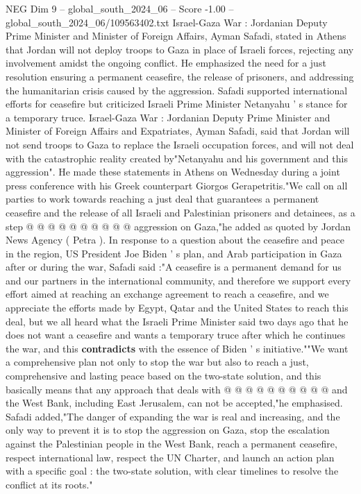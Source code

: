 \begin{textsample}{NEG Dim 9 – global\_south\_2024\_06 – Score -1.00 – global\_south\_2024\_06/109563402.txt}  \label{ex:f9_neg_402}
Israel-Gaza War : Jordanian Deputy Prime Minister and Minister of Foreign Affairs, Ayman Safadi, stated in Athens that Jordan will not deploy troops to Gaza in place of Israeli forces, rejecting any involvement amidst the ongoing conflict.
He emphasized the need for a just resolution ensuring a permanent ceasefire, the release of prisoners, and addressing the humanitarian crisis caused by the aggression.
Safadi supported international efforts for ceasefire but criticized Israeli Prime Minister Netanyahu ' s stance for a temporary truce.
Israel-Gaza War : Jordanian Deputy Prime Minister and Minister of Foreign Affairs and Expatriates, Ayman Safadi, said that Jordan will not send troops to Gaza to replace the Israeli occupation forces, and will not deal with the catastrophic reality created by"Netanyahu and his government and this aggression".
He made these statements in Athens on Wednesday during a joint press conference with his Greek counterpart Giorgos Gerapetritis."We call on all parties to work towards reaching a just deal that guarantees a permanent ceasefire and the release of all Israeli and Palestinian prisoners and detainees, as a step @ @ @ @ @ @ @ @ @ @ aggression on Gaza,"he added as quoted by Jordan News Agency ( Petra ).
In response to a question about the ceasefire and peace in the region, US President Joe Biden ' s plan, and Arab participation in Gaza after or during the war, Safadi said :"A ceasefire is a permanent demand for us and our partners in the international community, and therefore we support every effort aimed at reaching an exchange agreement to reach a ceasefire, and we appreciate the efforts made by Egypt, Qatar and the United States to reach this deal, but we all heard what the Israeli Prime Minister said two days ago that he does not want a ceasefire and wants a temporary truce after which he continues the war, and this \textbf{contradicts} with the essence of Biden ' s initiative.""We want a comprehensive plan not only to stop the war but also to reach a just, comprehensive and lasting peace based on the two-state solution, and this basically means that any approach that deals with @ @ @ @ @ @ @ @ @ @ and the West Bank, including East Jerusalem, can not be accepted,"he emphasised.
Safadi added,"The danger of expanding the war is real and increasing, and the only way to prevent it is to stop the aggression on Gaza, stop the escalation against the Palestinian people in the West Bank, reach a permanent ceasefire, respect international law, respect the UN Charter, and launch an action plan with a specific goal : the two-state solution, with clear timelines to resolve the conflict at its roots."

\end{textsample}
